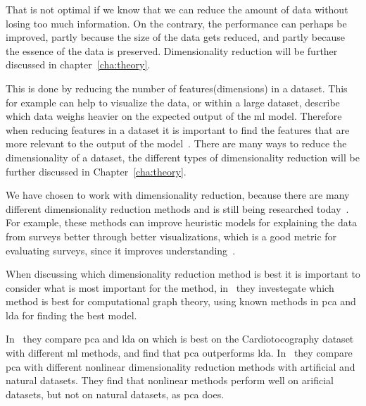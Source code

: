 That is not optimal if we know that we can reduce the amount of data without losing too much information. On the contrary, the performance can perhaps be improved, partly because the size of the data gets reduced, and partly because the essence of the data is preserved. Dimensionality reduction will be further discussed in chapter~\ref{cha:theory}.

This is done by reducing the number of features(dimensions) in a dataset. This for example can help to visualize the data, or within a large dataset, describe which data weighs heavier on the expected output of the \gls{ml} model. Therefore when reducing features in a dataset it is important to find the features that are more relevant to the output of the model~\cite{Feature-engineering-zheng}. There are many ways to reduce the dimensionality of a dataset, the different types of dimensionality reduction will be further discussed in Chapter~\ref{cha:theory}.

We have chosen to work with dimensionality reduction, because there are many different dimensionality reduction methods and is still being researched today~\cite{dimensionality-reduction-cheng}. For example, these methods can improve heuristic models for explaining the data from surveys better through better visualizations, which is a good metric for evaluating surveys, since it improves understanding~\cite{dimensionality-reduction-cheng}. 

When discussing which dimensionality reduction method is best it is important to consider what is most important for the method, in~\cite{dimensionality-reduction-maitra} they investegate which method is best for computational graph theory, using known methods in \gls{pca} and \gls{lda} for finding the best model. 

In~\cite{dimensionality-reduction-reddy} they compare \gls{pca} and \gls{lda} on which is best on the Cardiotocography dataset with different \gls{ml} methods, and find that \gls{pca} outperforms \gls{lda}. In~\cite{dimensionality-reduction-comparative-review} they compare \gls{pca} with different nonlinear dimensionality reduction methods with artificial and natural datasets. They find that nonlinear methods perform well on arificial datasets, but not on natural datasets, as \gls{pca} does.




